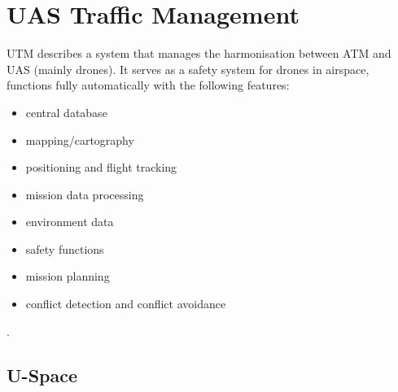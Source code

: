 \section{UAS Traffic Management}

\Gls{UTM} describes a system that manages the harmonisation between \gls{ATM} and \gls{UAS} (mainly drones). 
It serves as a safety system for drones in airspace, functions fully automatically with the following features: 
\begin{itemize}
    \item central database
    \item mapping/cartography
    \item positioning and flight tracking
    \item mission data processing
    \item environment data
    \item safety functions
    \item mission planning
    \item conflict detection and conflict avoidance
\end{itemize}
\cite{brm_utm_atm}.


\subsection{U-Space}
















